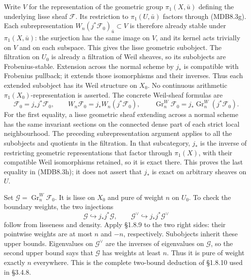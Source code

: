 \documentclass[
]{report}
\begin{document}
Write \(V\) for the representation of the geometric group
\(\pi_1(X,\bar u)\) defining the underlying lisse sheaf \(\mathcal F\).
Its restriction to \(\pi_1(U,\bar u)\) factors through (MDB8.3g). Each
subrepresentation \(W_n(j^*\mathcal F_0)_{\bar u}\subset V\) is
therefore already stable under \(\pi_1(X,\bar u)\): the surjection has
the same image on \(V\), and its kernel acts trivially on \(V\) and on
each subspace. This gives the lisse geometric subobject. The filtration
on \(U_0\) is already a filtration of Weil sheaves, so its subobjects
are Frobenius-stable. Extension across the normal scheme by \(j_*\) is
compatible with Frobenius pullback; it extends those isomorphisms and
their inverses. Thus each extended subobject has its Weil structure on
\(X_0\). No continuous arithmetic \(\pi_1(X_0)\)-representation is
asserted. The concrete Weil-sheaf formulas are \[
\mathcal F_0=j_*j^*\mathcal F_0,\qquad
W_n\mathcal F_0=j_*W_n(j^*\mathcal F_0),\qquad
\operatorname{Gr}_n^W\mathcal F_0
=j_*\operatorname{Gr}_n^W(j^*\mathcal F_0).
\tag{MDB8.3h}
\] For the first equality, a lisse geometric sheaf extending across a
normal scheme has the same invariant sections on the connected dense
part of each strict local neighbourhood. The preceding subrepresentation
argument applies to all the subobjects and quotients in the filtration.
In that subcategory, \(j_*\) is the inverse of restricting geometric
representations that factor through \(\pi_1(X)\), with their compatible
Weil isomorphisms retained, so it is exact there. This proves the last
equality in (MDB8.3h); it does not assert that \(j_*\) is exact on
arbitrary sheaves on \(U\).

Set \(\mathcal G=\operatorname{Gr}_n^W\mathcal F_0\). It is lisse on
\(X_0\) and pure of weight \(n\) on \(U_0\). To check the boundary
weights, the two injections \[
\mathcal G\hookrightarrow j_*j^*\mathcal G,\qquad
\mathcal G^\vee\hookrightarrow j_*j^*\mathcal G^\vee
\tag{MDB8.3i}
\] follow from lisseness and density. Apply §1.8.9 to the two right
sides: their pointwise weights are at most \(n\) and \(-n\),
respectively. Subobjects inherit these upper bounds. Eigenvalues on
\(\mathcal G^\vee\) are the inverses of eigenvalues on \(\mathcal G\),
so the second upper bound says that \(\mathcal G\) has weights at least
\(n\). Thus it is pure of weight exactly \(n\) everywhere. This is the
complete two-bound deduction of §1.8.10 used in §3.4.8.
\end{document}
